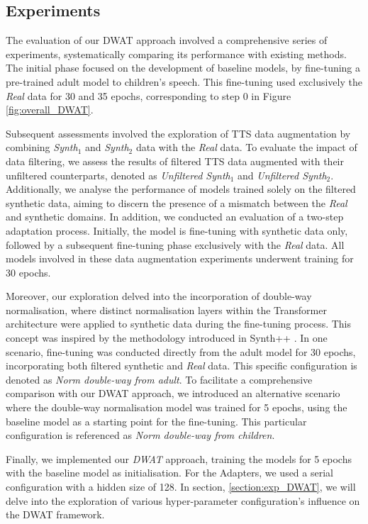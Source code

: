 \subsection{Experiments}
The evaluation of our \ac{DWAT} approach involved a comprehensive series of experiments, systematically comparing its performance with existing methods. The initial phase focused on the development of baseline models, by fine-tuning a pre-trained adult model to children's speech. This fine-tuning used exclusively the \textit{Real} data for 30 and 35 epochs, corresponding to step 0 in Figure \ref{fig:overall_DWAT}.

Subsequent assessments involved the exploration of \ac{TTS} data augmentation by combining \textit{Synth$_1$} and \textit{Synth$_2$} data with the \textit{Real} data. To evaluate the impact of data filtering, we assess the results of filtered \ac{TTS} data augmented with their unfiltered counterparts, denoted as \textit{Unfiltered Synth$_1$} and \textit{Unfiltered Synth$_2$}. Additionally, we analyse the performance of models trained solely on the filtered synthetic data, aiming to discern the presence of a mismatch between the \textit{Real} and synthetic domains. In addition, we conducted an evaluation of a two-step adaptation process. Initially, the model is fine-tuning with synthetic data only, followed by a subsequent fine-tuning phase exclusively with the \textit{Real} data. All models involved in these data augmentation experiments underwent training for 30 epochs.

Moreover, our exploration delved into the incorporation of double-way normalisation, where distinct normalisation layers within the Transformer architecture were applied to synthetic data during the fine-tuning process. This concept was inspired by the methodology introduced in Synth++ \cite{hu2022synt++}. In one scenario, fine-tuning was conducted directly from the adult model for 30 epochs, incorporating both filtered synthetic and \textit{Real} data. This specific configuration is denoted as \textit{Norm double-way from adult}. To facilitate a comprehensive comparison with our \ac{DWAT} approach, we introduced an alternative scenario where the double-way normalisation model was trained for 5 epochs, using the baseline model as a starting point for the fine-tuning. This particular configuration is referenced as \textit{Norm double-way from children}.

Finally, we implemented our \textit{\ac{DWAT}} approach, training the models for 5 epochs with the baseline model as initialisation. For the Adapters, we used a serial configuration with a hidden size of 128. In section, \ref{section:exp_DWAT}, we will delve into the exploration of various hyper-parameter configuration's influence on the \ac{DWAT} framework.

